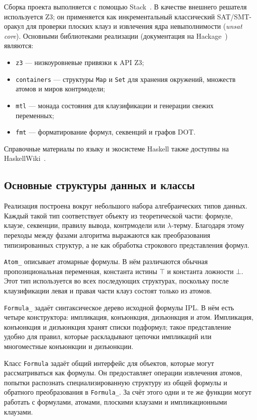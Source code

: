 \documentclass[14pt, russian]{scrartcl}
\begin{document}
Сборка проекта выполняется с помощью Stack~\cite{StackDocs}. В качестве внешнего
решателя используется Z3; он применяется как инкрементальный классический
SAT/SMT-оракул для проверки плоских клауз и извлечения ядра невыполнимости
(\emph{unsat core}). Основными библиотеками реализации
(документация на Hackage~\cite{Hackage}) являются:
\begin{itemize}
\item \texttt{z3} --- низкоуровневые привязки к API Z3;
\item \texttt{containers} --- структуры \texttt{Map} и \texttt{Set} для
  хранения окружений, множеств атомов и миров контрмодели;
\item \texttt{mtl} --- монада состояния для клаузификации и генерации свежих
  переменных;
\item \texttt{fmt} --- форматирование формул, секвенций и графов DOT.
\end{itemize}

Справочные материалы по языку и экосистеме Haskell также доступны на
HaskellWiki~\cite{HaskellWiki}.

\subsection{Основные структуры данных и классы}

Реализация построена вокруг небольшого набора алгебраических типов данных.
Каждый такой тип соответствует объекту из теоретической части: формуле, клаузе,
секвенции, правилу вывода, контрмодели или $\lambda$-терму. Благодаря этому
переходы между фазами алгоритма выражаются как преобразования типизированных
структур, а не как обработка строкового представления формул.

\texttt{Atom\_} описывает атомарные формулы. В нём различаются обычная
пропозициональная переменная, константа истины $\top$ и константа ложности
$\bot$. Этот тип используется во всех последующих структурах, поскольку после
клаузификации левая и правая части клауз состоят только из атомов.

\texttt{Formula\_} задаёт синтаксическое дерево исходной формулы IPL. В нём
есть четыре конструктора: импликация, конъюнкция, дизъюнкция и атом.
Импликация, конъюнкция и дизъюнкция хранят списки подформул; такое
представление удобно для правил, которые раскладывают цепочки импликаций или
многоместные конъюнкции и дизъюнкции.

Класс \texttt{Formula} задаёт общий интерфейс для объектов, которые могут
рассматриваться как формулы. Он предоставляет операции извлечения атомов,
попытки распознать специализированную структуру из общей формулы и обратного
преобразования в \texttt{Formula\_}. За счёт этого одни и те же функции могут
работать с формулами, атомами, плоскими клаузами и импликационными клауза\-ми.
\end{document}
